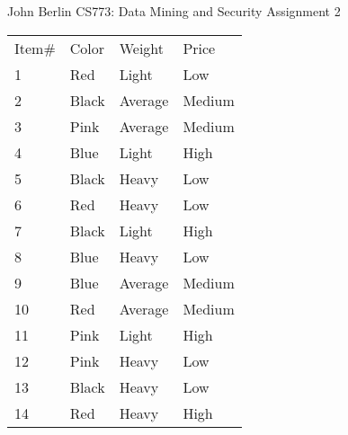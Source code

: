 \documentclass[letterpaper,12pt]{article}
\def\precision{3}
\begin{document}
\newcolumntype{Z}{S[round-precision=\precision]}


\begin{center}
	\large{John Berlin} \large{CS773: Data Mining and Security} \large{Assignment 2}
\end{center}

\begin{center}
	\begin{tabu}{|l|l|l|l|}
		\hline
		\everyrow{\hline}
        {Item\#} &{Color} &{Weight} &{Price} \\
		1      & Red   & Light   & Low    \\
		2      & Black & Average & Medium \\
		3      & Pink  & Average & Medium \\
		4      & Blue  & Light   & High   \\
		5      & Black & Heavy   & Low    \\
		6      & Red   & Heavy   & Low    \\
		7      & Black & Light   & High   \\
		8      & Blue  & Heavy   & Low    \\
		9      & Blue  & Average & Medium \\
		10     & Red   & Average & Medium \\
		11     & Pink  & Light   & High   \\
		12     & Pink  & Heavy   & Low    \\
		13     & Black & Heavy   & Low    \\
		14     & Red   & Heavy   & High  
	\end{tabu}		
\end{center}
\end{document}
